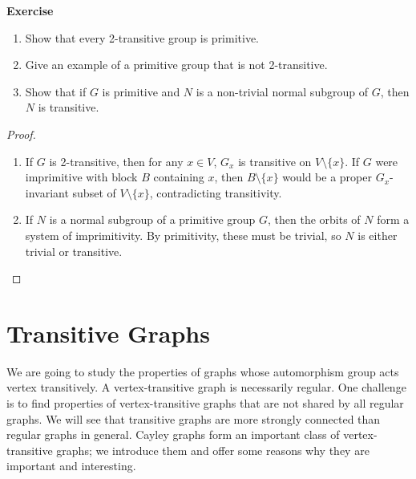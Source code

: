 \documentclass[12pt,a4paper,openany]{book}
\begin{document}
\bigskip\noindent\textbf{Exercise}\label{ex:primitivity-exercises}
\begin{enumerate}
\item Show that every 2-transitive group is primitive.
\item Give an example of a primitive group that is not 2-transitive.
\item Show that if $G$ is primitive and $N$ is a non-trivial normal subgroup of $G$, then $N$ is transitive.
\end{enumerate}


\begin{proof}
\begin{enumerate}
\item If $G$ is 2-transitive, then for any $x \in V$, $G_x$ is transitive on $V \setminus \{x\}$. If $G$ were imprimitive with block $B$ containing $x$, then $B \setminus \{x\}$ would be a proper $G_x$-invariant subset of $V \setminus \{x\}$, contradicting transitivity.
\item If $N$ is a normal subgroup of a primitive group $G$, then the orbits of $N$ form a system of imprimitivity. By primitivity, these must be trivial, so $N$ is either trivial or transitive.
\end{enumerate}
\end{proof}


\chapter{Transitive Graphs}

We are going to study the properties of graphs whose automorphism group 
acts vertex transitively. A vertex-transitive graph is necessarily regular. 
One challenge is to find properties of vertex-transitive graphs that are not 
shared by all regular graphs. We will see that transitive graphs are more 
strongly connected than regular graphs in general. Cayley graphs form an 
important class of vertex-transitive graphs; we introduce them and offer 
some reasons why they are important and interesting.
\end{document}
